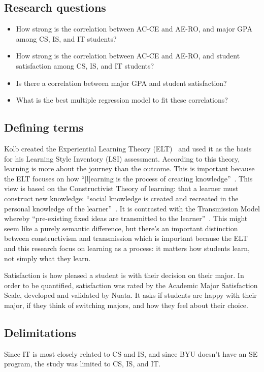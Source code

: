 \subsection{Research questions}
\begin{itemize}
  \item How strong is the correlation between AC-CE and AE-RO, and major GPA among CS, IS, and IT students?
  \item How strong is the correlation between AC-CE and AE-RO, and student satisfaction among CS, IS, and IT students?
  \item Is there a correlation between major GPA and student satisfaction?
  \item What is the best multiple regression model to fit these correlations?
\end{itemize}

\subsection{Defining terms}
Kolb created the Experiential Learning Theory (ELT)~\citep{kolb2005a} and used it as the basis for his Learning Style Inventory (LSI) assessment. According to this theory, learning is more about the journey than the outcome. This is important because the ELT focuses on how ``[l]earning is the process of creating knowledge''~\citep{kolb2005a}. This view is based on the Constructivist Theory of learning: that a learner must construct new knowledge: ``social knowledge is created and recreated in the personal knowledge of the learner''~\citep{kolb2005b}. It is contrasted with the Transmission Model whereby ``pre-existing fixed ideas are transmitted to the learner''~\citep{kolb2005a}. This might seem like a purely semantic difference, but there's an important distinction between constructivism and transmission which is important because the ELT and this research focus on learning as a process: it matters how students learn, not simply what they learn.

Satisfaction is how pleased a student is with their decision on their major. In order to be quantified, satisfaction was rated by the Academic Major Satisfaction Scale, developed and validated by Nuata. It asks if students are happy with their major, if they think of switching majors, and how they feel about their choice.

\subsection{Delimitations}
Since IT is most closely related to CS and IS, and since BYU doesn't have an SE program, the study was limited to CS, IS, and IT.

